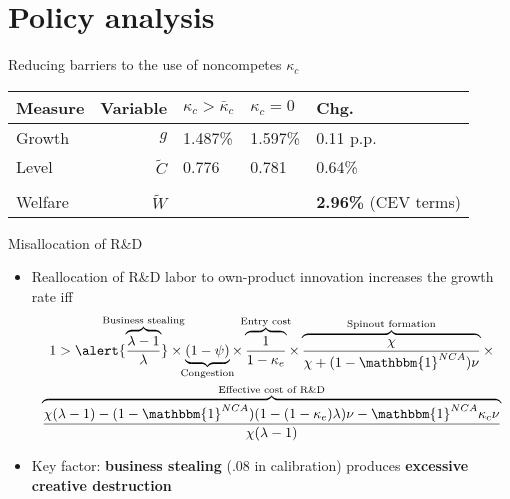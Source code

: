 \documentclass[english,usenames,dvipsnames]{beamer}
\begin{document}
\section{Policy analysis}

\begin{frame}
\tableofcontents[currentsection]
\end{frame}

\begin{frame}{Reducing barriers to the use of noncompetes $\kappa_c$}\label{reducing_kappa_c_table}
	\begin{table}
		\centering
		\small
		\begin{tabular}{lrlll}
			\toprule \toprule
			Measure & Variable & $\kappa_c > \bar{\kappa}_c$ & $\kappa_c = 0$ & Chg. \tabularnewline
			\midrule
			Growth & $g$ & 1.487\% & 1.597\% & 0.11 p.p. \tabularnewline
			Level & $\tilde{C}$  & 0.776 &  0.781 & 0.64\% \tabularnewline 
			\tabularnewline
			Welfare & $\tilde{W}$  &  & & \alert{\textbf{2.96\%}} (CEV terms)  \tabularnewline
			\bottomrule
		\end{tabular}
	\end{table}
	\hyperlink{welfare}{}
	\hyperlink{decomposition_growth_increase}{}
	\hyperlink{plots:reducing_kappa_c1}{}
	\hyperlink{plots:reducing_kappa_c2}{}
	\hyperlink{robustness_to_moments}{} \hyperlink{robustness_to_parameters}{}
	\hyperlink{efficiency}{}
\end{frame}


\begin{frame}{Misallocation of R\&D}\label{misallocation_of_rd}
	\begin{itemize}
		\item <+-> Reallocation of R\&D labor to own-product innovation increases the growth rate iff \hyperlink{misallocation_of_rd:derivation}{}
		\footnotesize
		\begin{multline*}
		1 > \alert{\overbrace{\frac{\lambda-1}{\lambda}}^{\mathclap{\text{Business stealing}}}} \times \underbrace{(1-\psi)}_{\mathclap{\text{Congestion}}}   \times \overbrace{\frac{1}{1-\kappa_{e}}}^{\mathclap{\text{Entry cost}}} \times \overbrace{\frac{\chi}{\chi + (1-\mathbbm{1}^{NCA})\nu}}^{\mathclap{\text{Spinout formation}}} \times \\ \overbrace{\frac{\chi(\lambda-1) -(1-\mathbbm{1}^{NCA}) (1-(1-\kappa_e)\lambda)\nu - \mathbbm{1}^{NCA} \kappa_c \nu}{\chi(\lambda-1)}}^{\mathclap{\text{Effective cost of R\&D}}}  \label{eq:RD_reallocation} 
		\end{multline*}
		\normalsize
		\item <+-> Key factor: \alert{\textbf{business stealing}} (.08 in calibration) produces \alert{\textbf{excessive creative destruction}} \hyperlink{other_factors}{}
	\end{itemize}
\end{frame}
\end{document}

